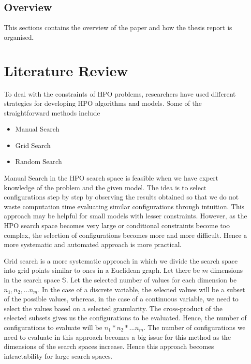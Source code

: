 \documentclass[11pt]{report}
\begin{document}
\section{Overview}
This sections contains the overview of the paper and how the thesis report is organised.


\chapter{Literature Review}
To deal with the constraints of HPO problems, researchers have used different strategies for developing HPO algorithms and models.
Some of the straightforward methods include
\begin{itemize}
\item Manual Search
\item Grid Search
\item Random Search
\end{itemize}


Manual Search in the HPO search space is feasible when we have expert knowledge of the problem and the given model. 
The idea is to select configurations step by step by observing the results obtained
so that we do not waste computation time evaluating similar configurations through intuition.
This approach may be helpful for small models with lesser constraints.
However, as the HPO search space becomes very large or conditional constraints become too complex, the selection of configurations becomes more and more difficult.
Hence a more systematic and automated approach is more practical.

Grid search is a more systematic approach in which we divide the search space into grid points similar to ones in a Euclidean graph.
Let there be $m$ dimensions in the search space $\mathbb{S}$. Let the selected number of values for each dimension be $n_1, n_2, ... n_m$. In the case of a discrete variable, the selected values will be a subset of the possible values, whereas, in the case of a continuous variable, we need to select the values based on a selected granularity.
The cross-product of the selected subsets gives us the configurations to be evaluated. Hence, the number of configurations to evaluate will be $n_1 * n_2 * ... n_m$.
The number of configurations we need to evaluate in this approach becomes a big issue for this method as the dimensions of the search spaces increase.
Hence this approach becomes intractability for large search spaces.
\end{document}
